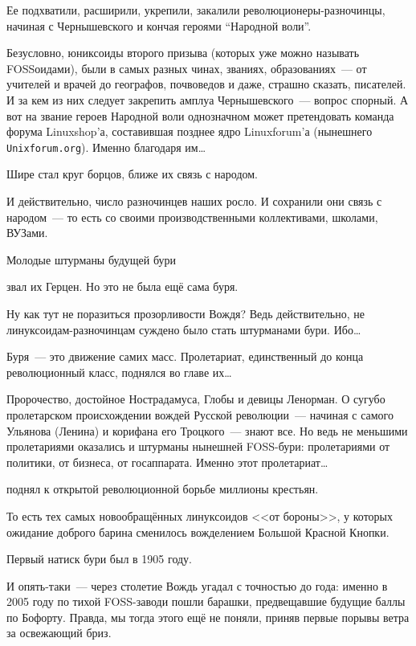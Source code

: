 \begin{shadequote}{}
Ее подхватили, расширили, укрепили, закалили революционеры-разночинцы, начиная с Чернышевского и кончая героями ``Народной воли''.
\end{shadequote}
Безусловно, юниксоиды второго призыва (которых уже можно называть FOSSоидами), были в самых разных чинах, званиях, образованиях~--- от учителей и врачей до географов, почвоведов и даже, страшно сказать, писателей. И за кем из них следует закрепить амплуа Чернышевского~--- вопрос спорный. А вот на звание героев Народной воли однозначном может претендовать команда форума Linuxshop'а, составившая позднее ядро Linuxforum'а (нынешнего \texttt{Unixforum.org}). Именно благодаря им\dots
\begin{shadequote}{}
Шире стал круг борцов, ближе их связь с народом.
\end{shadequote}

И действительно, число разночинцев наших росло. И сохранили они связь с народом~--- то есть со своими производственными коллективами, школами, ВУЗами.
\begin{shadequote}{}
Молодые штурманы будущей бури
\end{shadequote}
звал их Герцен. Но это не была ещё сама буря.

Ну как тут не поразиться прозорливости Вождя? Ведь действительно, не линуксоидам-разночинцам суждено было стать штурманами бури. Ибо\dots

\begin{shadequote}{}
Буря~--- это движение самих масс. Пролетариат, единственный до конца революционный класс, поднялся во главе их\dots
\end{shadequote}

Пророчество, достойное Нострадамуса, Глобы и девицы Ленорман. О сугубо пролетарском происхождении вождей Русской революции~--- начиная с самого Ульянова (Ленина) и корифана его Троцкого~--- знают все. Но ведь не меньшими пролетариями оказались и штурманы нынешней FOSS-бури: пролетариями от политики, от бизнеса, от госаппарата. Именно этот пролетариат\dots
\begin{shadequote}{}
 поднял к открытой революционной борьбе миллионы крестьян.
\end{shadequote}

То есть тех самых новообращённых линуксоидов <<от бороны>>, у которых ожидание доброго барина сменилось вожделением Большой Красной Кнопки.

\begin{shadequote}{}
Первый натиск бури был в 1905 году.
\end{shadequote}
И опять-таки~--- через столетие Вождь угадал с точностью до года: именно в 2005 году по тихой FOSS-заводи пошли барашки, предвещавшие будущие баллы по Бофорту. Правда, мы тогда этого ещё не поняли, приняв первые порывы ветра за освежающий бриз.

